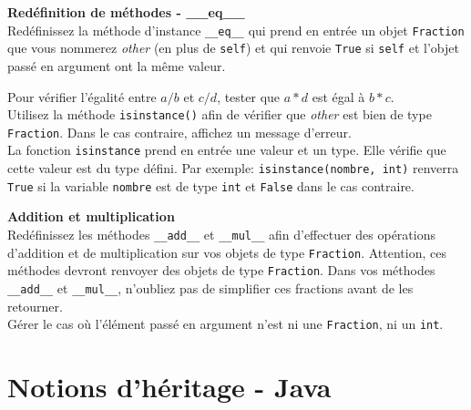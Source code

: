 \begin{Exercice}[15 minutes] \textbf{Redéfinition de méthodes - \_\_eq\_\_}\\
	Redéfinissez la méthode d'instance \lstinline{__eq__} qui prend en entrée un objet \lstinline{Fraction} que vous nommerez \textit{other} (en plus de \lstinline{self}) et qui renvoie \lstinline{True} si \lstinline{self} et l'objet passé en argument ont la même valeur.
	\begin{conseil}
		Pour vérifier l'égalité entre $a/b$ et $c/d$, tester que $a*d$ est égal à $b*c$. \\
		Utilisez la méthode \lstinline{isinstance()} afin de vérifier que \textit{other} est bien de type \lstinline{Fraction}. Dans le cas contraire, affichez un message d'erreur.
		\\La fonction \lstinline{isinstance} prend en entrée une valeur et un type. Elle vérifie que cette valeur est du type défini. Par exemple: \lstinline{isinstance(nombre, int)} renverra \lstinline{True} si la variable \lstinline{nombre} est de type \lstinline{int} et \lstinline{False} dans le cas contraire.
	\end{conseil}
\end{Exercice}

\begin{Exercice}[15 minutes] \textbf{Addition et multiplication}\\
	Redéfinissez les méthodes \lstinline{__add__} et \lstinline{__mul__} afin d'effectuer des opérations d'addition et de multiplication sur vos objets de type \lstinline{Fraction}. Attention, ces méthodes devront renvoyer des objets de type \lstinline{Fraction}. Dans vos méthodes \lstinline{__add__} et \lstinline{__mul__}, n'oubliez pas de simplifier ces fractions avant de les retourner.\\
	Gérer le cas où l'élément passé en argument n'est ni une \lstinline{Fraction}, ni un \lstinline{int}.
\end{Exercice}


\begin{solution}
	
\end{solution}
\begin{solution}
	
\end{solution}

\newpage
\section{Notions d'héritage - Java}


